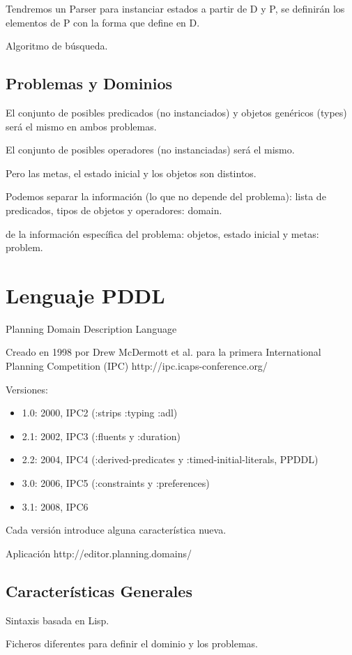 \documentclass[12pt, twoside, openright]{report} %
\begin{document}
Tendremos un Parser para instanciar estados a partir de D y P, se definirán los elementos de P con la forma que define en D. 

Algoritmo de búsqueda.

\subsection{Problemas y Dominios}
El conjunto de posibles predicados (no instanciados) y objetos genéricos (types) será el mismo en ambos problemas.

El conjunto de posibles operadores (no instanciadas) será el mismo.

Pero las metas, el estado inicial y los objetos son distintos.

Podemos separar la información (lo que no depende del problema): lista de predicados, tipos de objetos y operadores: domain.

de la información específica del problema: objetos, estado inicial y metas: problem.

\section{Lenguaje PDDL}
Planning Domain Description Language

Creado en 1998 por Drew McDermott et al. para la primera International Planning Competition (IPC) http://ipc.icaps-conference.org/

Versiones:
\begin{itemize}
	\item 1.0: 2000, IPC2 (:strips :typing :adl)
	\item 2.1: 2002, IPC3 (:fluents y :duration)
	\item 2.2: 2004, IPC4 (:derived-predicates y :timed-initial-literals, PPDDL)
	\item 3.0: 2006, IPC5 (:constraints y :preferences)
	\item 3.1: 2008, IPC6
\end{itemize}
Cada versión introduce alguna característica nueva.

Aplicación http://editor.planning.domains/

\subsection{Características Generales}
Sintaxis basada en Lisp.

Ficheros diferentes para definir el dominio y los problemas.
\end{document}

